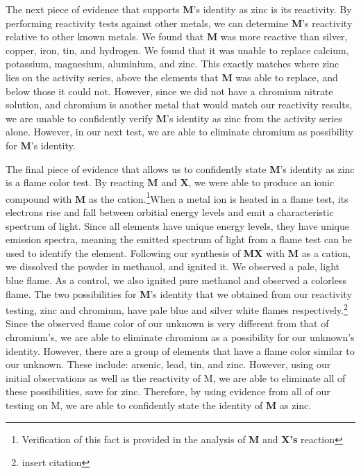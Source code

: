 \documentclass[titlepage]{article}
\begin{document}
The next piece of evidence that supports \textbf{M}'s identity as zinc is its reactivity. By performing reactivity tests against other metals, we can determine \textbf{M}'s reactivity relative to other known metals. We found that \textbf{M} was more reactive than silver, copper, iron, tin, and hydrogen. We found that it was unable to replace calcium, potassium, magnesium, aluminium, and zinc. This exactly matches where zinc lies on the activity series, above the elements that \textbf{M} was able to replace, and below those it could not. However, since we did not have a chromium nitrate solution, and chromium is another metal that would match our reactivity results, we are unable to confidently verify \textbf{M}'s identity as zinc from the activity series alone. However, in our next test, we are able to eliminate chromium as possibility for \textbf{M}'s identity.

The final piece of evidence that allows us to confidently state \textbf{M}'s identity as zinc is a flame color test. By reacting \textbf{M} and \textbf{X}, we were able to produce an ionic compound with \textbf{M} as the cation.\footnote{Verification of this fact is provided in the analysis of \textbf{M} and \textbf{X's} reaction}When a metal ion is heated in a flame test, its electrons rise and fall between orbitial energy levels and emit a characteristic spectrum of light. Since all elements have unique energy levels, they have unique emission spectra, meaning the emitted spectrum of light from a flame test can be used to identify the element. Following our synthesis of \textbf{MX} with \textbf{M} as a cation, we dissolved the powder in methanol, and ignited it. We observed a pale, light blue flame. As a control, we also ignited pure methanol and observed a colorless flame. The two possibilities for \textbf{M}'s identity that we obtained from our reactivity testing, zinc and chromium, have pale blue and silver white flames respectively.\footnote{insert citation} Since the observed flame color of our unknown is very different from that of chromium's, we are able to eliminate chromium as a possibility for our unknown's identity. However, there are a group of elements that have a flame color similar to our unknown. These include: arsenic, lead, tin, and zinc. However, using our initial observations as well as the reactivity of M, we are able to eliminate all of these possibilities, save for zinc. Therefore, by using evidence from all of our testing on M, we are able to confidently state the identity of \textbf{M} as zinc.
\end{document}
